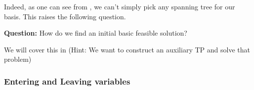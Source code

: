 Indeed, as one can see from , we can't simply pick any spanning tree for our basis. This raises the following question.

\textbf{Question: }How do we find an initial basic feasible solution?

We will cover this in  (Hint: We want to construct an auxiliary TP and solve that problem)

\subsubsection{Entering and Leaving variables}
